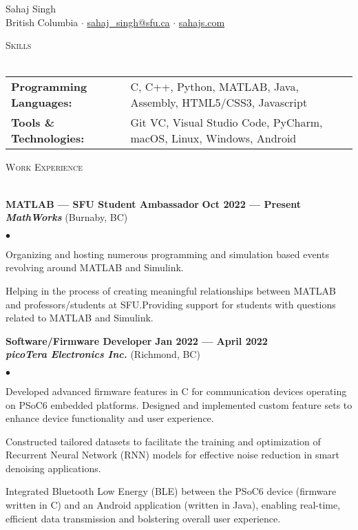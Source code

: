 \documentclass[a4paper]{article}
\newcommand{\lineunder} {
    \vspace*{-8pt} \\
    \hspace*{-18pt} \hrulefill\\
}
\newcommand{\contact} [4] {
    \vspace*{-10pt}
    \begin{center}
        {\Huge {#1}}\\
        \vspace*{4pt}
        #2 $\cdot$ \href{mailto:#3}{#3} $\cdot$ \href{http://#4}{#4}\\
    \end{center}
    \vspace*{-8pt}
}
\newcommand{\header} [1] {
    {\hspace*{-18pt}\vspace*{6pt} \textsc{#1}}
    \vspace*{-6pt} \lineunder{}
}
\newcommand{\employer} [5] {
    {\textbf{#3} \hfill \textbf{#4 --- #5}\\ \textbf{\emph{#1}} (#2)\\}
}
\newenvironment{achievements}{
    \begin{list}{$\bullet$}{
        \setlength{\topsep}{0pt}
        \setlength{\itemsep}{-1pt}
        \setlength{\parskip}{0pt}
        \setlength{\parsep}{0pt}
        \setlength{\partopsep}{0pt}}
    }{
    \end{list}
}
\begin{document}
    \vspace*{-40pt}

    \contact{Sahaj Singh}{British Columbia}{sahaj\_singh@sfu.ca}{sahajs.com}
    \vspace*{5pt}

    \header{Skills}
    \begin{tabular}{ l l }
        \textbf{Programming Languages:} & C, C++, Python, MATLAB, Java, Assembly, HTML5/CSS3, Javascript\\
        \textbf{Tools \& Technologies:} & Git VC, Visual Studio Code, PyCharm, macOS, Linux, Windows, Android\\
    \end{tabular}
    \vspace*{5pt}

    \header{Work Experience}
    \employer{MathWorks}{Burnaby, BC}{MATLAB --- SFU Student Ambassador}{Oct 2022}{Present}
    \begin{achievements}
        \item Organizing and hosting numerous programming and simulation based events revolving around MATLAB and Simulink.
        \item Helping in the process of creating meaningful relationships between MATLAB and professors/students at SFU.\@ Providing support for students with questions related to MATLAB and Simulink.
    \end{achievements}
    \vspace*{5pt}
    \employer{picoTera Electronics Inc.}{Richmond, BC}{Software/Firmware Developer}{Jan 2022}{April 2022}
    \begin{achievements}
        \item Developed advanced firmware features in C for communication devices operating on PSoC6 embedded platforms. Designed and implemented custom feature sets to enhance device functionality and user experience.
        \item Constructed tailored datasets to facilitate the training and optimization of Recurrent Neural Network (RNN) models for effective noise reduction in smart denoising applications.
        \item Integrated Bluetooth Low Energy (BLE) between the PSoC6 device (firmware written in C) and an Android application (written in Java), enabling real-time, efficient data transmission and bolstering overall user experience.
    \end{achievements}
    \vspace*{5pt}
\end{document}

